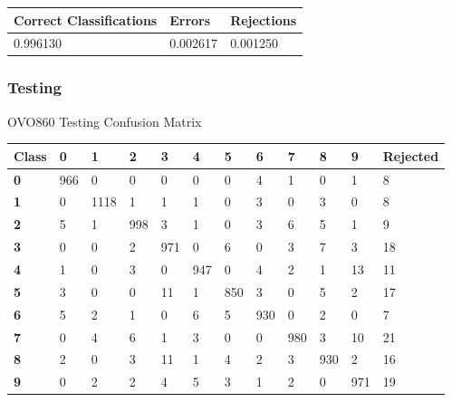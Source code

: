 \documentclass[
  a4paper,            %
  DIV=10,             %
  oneside,            %
  BCOR=5mm,           %
  parskip=half,       %
  numbers=noenddot,   %
  bibtotoc,           %
  listof=totoc,        %
  article
]{scrreprt}
\begin{document}
\begin{center}
  \begin{tabular}{|p{5cm}|p{3cm}|p{3cm}|}
    \hline
    \textbf{Correct Classifications} & \textbf{Errors} & \textbf{Rejections} \\
    \hline
    0.996130 & 0.002617 & 0.001250 \\
    \hline
  \end{tabular}
\end{center}
\subsubsection{Testing}
\begin{center}
  \small{OVO860 Testing Confusion Matrix}
  \begin{tabular}{|p{1cm}|p{1cm}|p{1cm}|p{1cm}|p{1cm}|p{1cm}|p{1cm}|p{1cm}|p{1cm}|p{1cm}|p{1cm}|p{1.7cm}|}
    \hline
    \textbf{Class} & \textbf{0} & \textbf{1} & \textbf{2} & \textbf{3} & \textbf{4} & \textbf{5} & \textbf{6} & \textbf{7} & \textbf{8} & \textbf{9} & \textbf{Rejected} \\
    \hline
    \textbf{0} & 966 & 0 & 0 & 0 & 0 & 0 & 4 & 1 & 0 & 1 & 8 \\
    \hline
    \textbf{1} & 0 & 1118 & 1 & 1 & 1 & 0 & 3 & 0 & 3 & 0 & 8 \\
    \hline
    \textbf{2} & 5 & 1 & 998 & 3 & 1 & 0 & 3 & 6 & 5 & 1 & 9 \\
    \hline
    \textbf{3} & 0 & 0 & 2 & 971 & 0 & 6 & 0 & 3 & 7 & 3 & 18 \\
    \hline
    \textbf{4} & 1 & 0 & 3 & 0 & 947 & 0 & 4 & 2 & 1 & 13 & 11 \\
    \hline
    \textbf{5} & 3 & 0 & 0 & 11 & 1 & 850 & 3 & 0 & 5 & 2 & 17 \\
    \hline
    \textbf{6} & 5 & 2 & 1 & 0 & 6 & 5 & 930 & 0 & 2 & 0 & 7 \\
    \hline
    \textbf{7} & 0 & 4 & 6 & 1 & 3 & 0 & 0 & 980 & 3 & 10 & 21 \\
    \hline
    \textbf{8} & 2 & 0 & 3 & 11 & 1 & 4 & 2 & 3 & 930 & 2 & 16 \\
    \hline
    \textbf{9} & 0 & 2 & 2 & 4 & 5 & 3 & 1 & 2 & 0 & 971 & 19 \\
    \hline
  \end{tabular}
\end{center}
\end{document}
